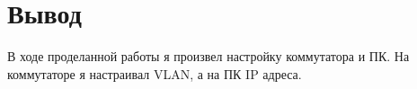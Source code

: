\chapter{Вывод}
В ходе проделанной работы я произвел настройку коммутатора и ПК. На коммутаторе я настраивал VLAN, а на ПК IP адреса.
\endinput